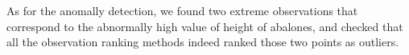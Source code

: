 \documentclass[10pt, paper=a4]{article}
\begin{document}
As for the anomally detection, we found two extreme observations that correspond
to the abnormally high value of height of abalones, and checked that all the
observation ranking methods indeed ranked those two points as outliers.
\end{document}
